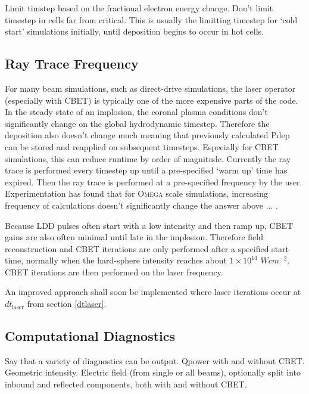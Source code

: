 Limit timstep based on the fractional electron energy change.
Don't limit timestep in cells far from critical.
This is usually the limitting timestep for `cold start' simulations initially, until deposition begins to occur in hot cells.

\subsection{Ray Trace Frequency}

For many beam simulations, such as direct-drive simulations, the laser operator (especially with CBET) is typically one of the more expensive parts of the code.
In the steady state of an implosion, the coronal plasma conditions don't significantly change on the global hydrodynamic timestep.
Therefore the deposition also doesn't change much meaning that previously calculated Pdep can be stored and reapplied on subsequent timesteps.
Especially for CBET simulations, this can reduce runtime by order of magnitude.
Currently the ray trace is performed every timestep up until a pre-specified `warm up' time has expired.
Then the ray trace is performed at a pre-specified frequency by the user.
Experimentation has found that for \textsc{Omega} scale simulations, increasing frequency of calculations doesn't significantly change the answer above ... .

Because LDD pulses often start with a low intensity and then ramp up, CBET gains are also often minimal until late in the implosion.
Therefore field reconstruction and CBET iterations are only performed after a specified start time, normally when the hard-sphere intensity reaches about $1\times 10^{14}$ $Wcm^{-2}$.
CBET iterations are then performed on the laser frequency.

An improved approach shall soon be implemented where laser iterations occur at $dt_{\text{laser}}$ from section \ref{dtlaser}.

\subsection{Computational Diagnostics}

Say that a variety of diagnostics can be output.
Qpower with and without CBET.
Geometric intensity.
Electric field (from single or all beams), optionally split into inbound and reflected components, both with and without CBET.

